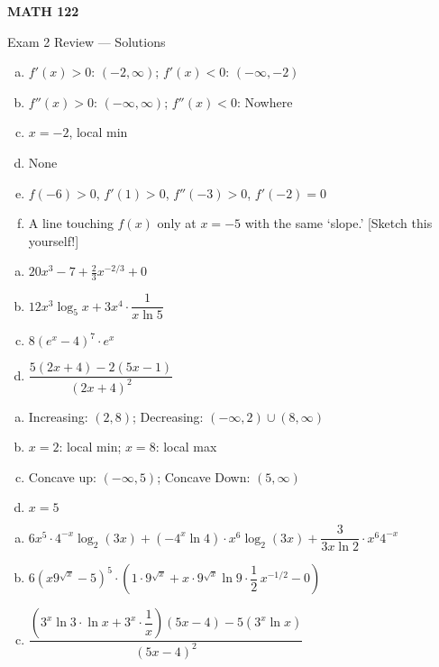 \documentclass[11pt,letterpaper]{article}
\begin{document}
\begin{center} {\bfseries \Large MATH 122 \par\vspace{0.3cm} \LARGE Exam 2 Review --- Solutions} \end{center} \par

\prob 
	\begin{enumerate}[(a)]
	\item $f'(x) > 0$: $(-2, \infty)$; $f'(x) < 0$: $(-\infty, -2)$
	\item $f''(x) > 0$: $(-\infty, \infty)$; $f''(x) < 0$: Nowhere
	\item $x= -2$, local min
	\item None
	\item $f(-6) > 0$, $f'(1) > 0$, $f''(-3) > 0$, $f'(-2)= 0$
	\item A line touching $f(x)$ only at $x= -5$ with the same `slope.' [Sketch this yourself!]
	\end{enumerate} \vfill



\prob 
	\begin{enumerate}[(a)]
	\item $20x^3 - 7 + \frac{2}{3} x^{-2/3} + 0$
	\item $12x^3 \log_5 x + 3x^4 \cdot \dfrac{1}{x \ln 5}$
	\item $8(e^x - 4)^7 \cdot e^x$
	\item $\dfrac{5(2x + 4) - 2(5x - 1)}{(2x + 4)^2}$
	\end{enumerate} \vfill



\prob 
	\begin{enumerate}[(a)]
	\item Increasing: $(2, 8)$; Decreasing: $(-\infty, 2) \cup (8, \infty)$
	\item $x= 2$: local min; $x= 8$: local max
	\item Concave up: $(-\infty, 5)$; Concave Down: $(5, \infty)$
	\item $x= 5$
	\end{enumerate} \vfill



\prob 
	\begin{enumerate}[(a)]
	\item $6x^5 \cdot 4^{-x} \log_2(3x) + (-4^x \ln 4) \cdot x^6 \log_2(3x) + \dfrac{3}{3x \ln 2} \cdot x^6 4^{-x}$
	\item $6(x9^{\sqrt{x}} - 5)^5 \cdot \left(1 \cdot 9^{\sqrt{x}} + x \cdot 9^{\sqrt{x}} \ln 9 \cdot \dfrac{1}{2} \, x^{-1/2} - 0 \right)$
	\item $\dfrac{\left(3^x \ln 3 \cdot \ln x + 3^x \cdot \dfrac{1}{x} \right)(5x - 4) - 5(3^x \ln x)}{(5x - 4)^2}$
	\end{enumerate} \vfill
\end{document}
